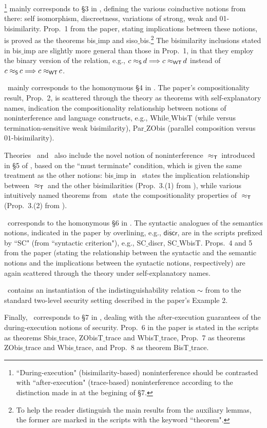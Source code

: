\Duri\footnote{``During-execution" (bisimilarity-based) noninterference should be contrasted with ``after-execution" (trace-based) 
noninterference according to the distinction made in \cite{pop-pos} at the begining of \S7.} 
mainly corresponds to \S3 in \cite{pop-pos}, defining the various coinductive notions 
from there: self isomorphism, discreetness, variations of strong, weak and 01-bisimilarity.  
Prop.~1 from the paper,  stating implications between these notions, 
is proved as the theorems bis$\_$imp and siso$\_$bis.\footnote{To help 
the reader distinguish the main results from the auxiliary lemmas, the former are marked 
in the scripts with the keyword ``theorem".} The bisimilarity inclusions stated in bis$\_$imp are slightly more general than those in Prop.~1, 
in that they employ the binary version of the relation,  e.g., $c \mbox{$\;\approx_{\tiny \textsf{S}}\,$} d \Longrightarrow c \mbox{$\;\approx_{\tiny \textsf{WT}}\,$} d$ instead of $c \mbox{$\;\approx_{\tiny \textsf{S}}\,$} c \Longrightarrow c \mbox{$\;\approx_{\tiny \textsf{WT}}\,$} c$.  

\Comp\ mainly corresponds to the homonymous \S4 in \cite{pop-pos}.  The paper's compositionality result, Prop.~2, is scattered through the theory 
as theorems with self-explanatory names, indication the compositionality relationship between notions of noninterference and language constructs, 
e.g., While$\_$WbisT (while versus termination-sensitive weak bisimilarity), Par$\_$ZObis (parallel composition versus $01$-bisimilarity).  

Theories \Duri\ and \Comp\ also include the novel notion of noninterference $\mbox{$\;\approx_{\tiny \textsf{T}}\,$}$ introduced in \S5 of \cite{pop-pos}, 
based on the ``must terminate" condition, which is given the same treatment as the other notions: 
bis$\_$imp in \Duri\ states the implication relationship between $\mbox{$\;\approx_{\tiny \textsf{T}}\,$}$ and the other bisimilarities (Prop.~3.(1) from \cite{pop-pos}), 
while various intuitively named theorems from \Lang\ state the compositionality properties of $\mbox{$\;\approx_{\tiny \textsf{T}}\,$}$ (Prop.~3.(2) from \cite{pop-pos}).  

\Synt\ corresponds to the homonymous \S6 in \cite{pop-pos}.  The syntactic analogues of the semantics notions, 
indicated in the paper by overlining, e.g., $\overline{\textsf{discr}}$, are in the scripts prefixed by ``SC" (from ``syntactic criterion"), e.g., SC$\_$discr, SC$\_$WbisT.  
Props.~4 and 5 from the paper (stating the relationship between the syntactic and the semantic notions 
and the implications between the syntactic notions, respectively) are again scattered through the theory under self-explanatory names.  

\Conc\ contains an instantiation of the 
indistinguishability relation $\!\!\mbox{$\;\sim\;$}\!\!$ from \cite{pop-pos} to the standard two-level security setting 
described in the paper's Example 2.  

Finally, \Afte\ corresponds to \S7 in \cite{pop-pos}, dealing with the after-execution guarantees of the during-execution 
notions of security. Prop.~6 in the paper is stated in the scripts as theorems Sbis$\_$trace, ZObisT$\_$trace and WbisT$\_$trace, 
Prop.~7 as theorems ZObis$\_$trace and Wbis$\_$trace, and  
Prop.~8 as theorem BisT$\_$trace.  
  

     
